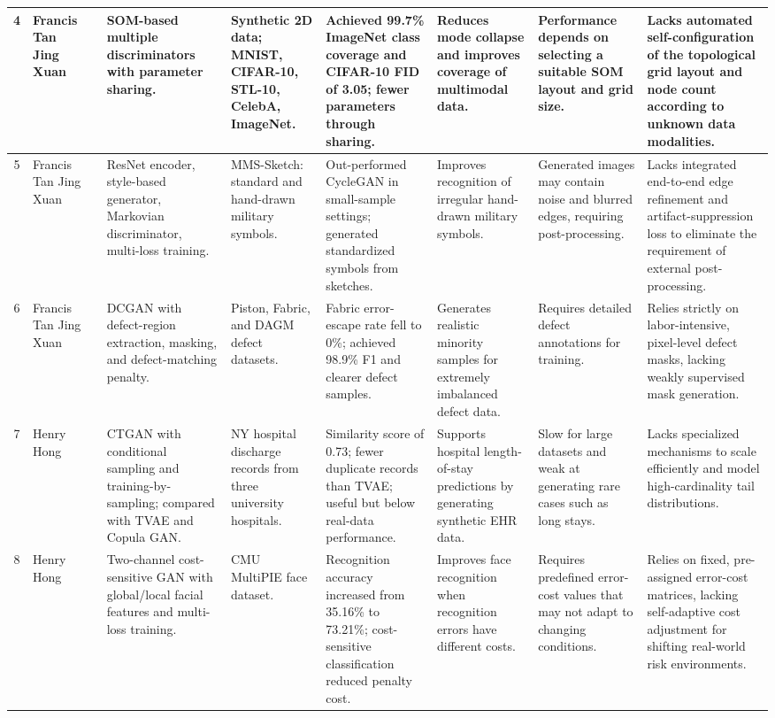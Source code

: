\documentclass[12pt,a4paper]{article}
\begin{document}
\begin{table}[H]
{\begin{tabular}{|c|p{2.5cm}|p{3cm}|p{3.5cm}|p{2.5cm}|p{3.5cm}|p{3cm}|p{3cm}|p{3cm}|}
4 & Francis Tan Jing Xuan & \parencite{li2024improving} & SOM-based multiple discriminators with parameter sharing. & Synthetic 2D data; MNIST, CIFAR-10, STL-10, CelebA, ImageNet. & Achieved 99.7\% ImageNet class coverage and CIFAR-10 FID of 3.05; fewer parameters through sharing. & Reduces mode collapse and improves coverage of multimodal data. & Performance depends on selecting a suitable SOM layout and grid size. & Lacks automated self-configuration of the topological grid layout and node count according to unknown data modalities. 
\\
\hline

5 & Francis Tan Jing Xuan & \parencite{zuo2023sketched} & ResNet encoder, style-based generator, Markovian discriminator, multi-loss training. & MMS-Sketch: standard and hand-drawn military symbols. & Out-performed CycleGAN in small-sample settings; generated standardized symbols from sketches. & Improves recognition of irregular hand-drawn military symbols. & Generated images may contain noise and blurred edges, requiring post-processing. & Lacks integrated end-to-end edge refinement and artifact-suppression loss to eliminate the requirement of external post-processing. 
\\
\hline

6 & Francis Tan Jing Xuan & \parencite{li2023eid} & DCGAN with defect-region extraction, masking, and defect-matching penalty. & Piston, Fabric, and DAGM defect datasets. & Fabric error-escape rate fell to 0\%; achieved 98.9\% F1 and clearer defect samples. & Generates realistic minority samples for extremely imbalanced defect data. & Requires detailed defect annotations for training. & Relies strictly on labor-intensive, pixel-level defect masks, lacking weakly supervised mask generation. 
\\
\hline

7 & Henry Hong & \parencite{bietsch2023electronic} & CTGAN with conditional sampling and training-by-sampling; compared with TVAE and Copula GAN. & NY hospital discharge records from three university hospitals. & Similarity score of 0.73; fewer duplicate records than TVAE; useful but below real-data performance. & Supports hospital length-of-stay predictions by generating synthetic EHR data. & Slow for large datasets and weak at generating rare cases such as long stays. & Lacks specialized mechanisms to scale efficiently and model high-cardinality tail distributions. 
\\
\hline

8 & Henry Hong & \parencite{chen2020generative} & Two-channel cost-sensitive GAN with global/local facial features and multi-loss training. & CMU MultiPIE face dataset. & Recognition accuracy increased from 35.16\% to 73.21\%; cost-sensitive classification reduced penalty cost. & Improves face recognition when recognition errors have different costs. & Requires predefined error-cost values that may not adapt to changing conditions. & Relies on fixed, pre-assigned error-cost matrices, lacking self-adaptive cost adjustment for shifting real-world risk environments.  
\\
\hline


\end{tabular}}
\end{table}
\end{document}
